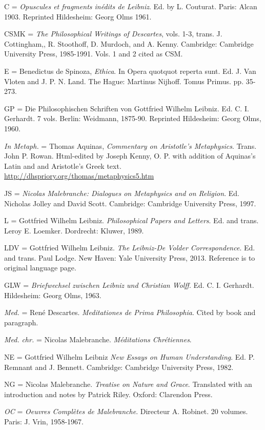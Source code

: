 \documentclass[]{article}
\begin{document}
C = \emph{Opuscules et fragments inédits de Leibniz}. Ed. by L.
Couturat. Paris: Alcan 1903. Reprinted Hildesheim: Georg Olms 1961.

CSMK = \emph{The Philosophical Writings of Descartes}, vols. 1-3, trans.
J. Cottingham,, R. Stoothoff, D. Murdoch, and A. Kenny. Cambridge:
Cambridge University Press, 1985-1991. Vols. 1 and 2 cited as CSM.

E = Benedictus de Spinoza, \emph{Ethica}. In Opera quotquot reperta
sunt. Ed. J. Van Vloten and J. P. N. Land. The Hague: Martinus Nijhoff.
Tomus Primus. pp. 35-273.

GP = Die Philosophischen Schriften von Gottfried Wilhelm Leibniz. Ed. C.
I. Gerhardt. 7 vols. Berlin: Weidmann, 1875-90. Reprinted Hildesheim:
Georg Olms, 1960.

\emph{In Metaph.} = Thomas Aquinas, \emph{Commentary on Aristotle's
	Metaphysics}. Trans. John P. Rowan. Html-edited by Joseph Kenny, O. P.
with addition of Aquinas's Latin and and Aristotle's Greek text.
\url{http://dhspriory.org/thomas/metaphysics5.htm}

JS = \emph{Nicolas Malebranche: Dialogues on Metaphysics and on
	Religion}. Ed. Nicholas Jolley and David Scott. Cambridge: Cambridge
University Press, 1997.

L = Gottfried Wilhelm Leibniz. \emph{Philosophical Papers and Letters}.
Ed. and trans. Leroy E. Loemker. Dordrecht: Kluwer, 1989.

LDV = Gottfried Wilhelm Leibniz. \emph{The Leibniz-De Volder
	Correspondence}. Ed. and trans. Paul Lodge. New Haven: Yale University
Press, 2013. Reference is to original language page.

GLW = \emph{Briefwechsel zwischen Leibniz und Christian Wolff}. Ed. C.
I. Gerhardt. Hildesheim: Georg Olms, 1963.

\emph{Med.} = René Descartes. \emph{Meditationes de Prima Philosophia}.
Cited by book and paragraph.

\emph{Med.} \emph{chr.} = Nicolas Malebranche. \emph{Méditations
	Chrétiennes}.

NE = Gottfried Wilhelm Leibniz \emph{New Essays on Human Understanding}.
Ed. P. Remnant and J. Bennett. Cambridge: Cambridge University Press,
1982.

NG = Nicolas Malebranche. \emph{Treatise on Nature and Grace}.
Translated with an introduction and notes by Patrick Riley. Oxford:
Clarendon Press.

\emph{OC} = \emph{Oeuvres Complètes de Malebranche}. Directeur A.
Robinet. 20 volumes. Paris: J. Vrin, 1958-1967.
\end{document}
